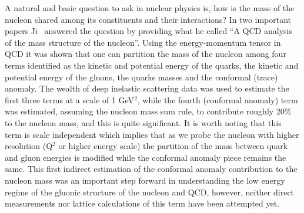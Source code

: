 \documentclass[12pt]{article}
\begin{document}
A natural and basic question to ask in nuclear physics is, how is the mass of the nucleon shared among its constituents and their interactions? In two important  papers Ji~\cite{Ji:1994av,Ji:1995sv} answered the question by providing what he called ``A QCD analysis of the mass structure of the nucleon''. Using the energy-momentum tensor in QCD it was shown that one can partition the mass of the nucleon among four terms identified as the kinetic and potential energy of the quarks, the  kinetic and potential energy of the gluons, the quarks masses and the conformal (trace) anomaly. The wealth of deep inelastic scattering data  was used to estimate the first three terms at a scale of 1 GeV$^2$, while the fourth (conformal anomaly)  term was estimated, assuming the nucleon mass sum rule, to contribute roughly 20\% to the nucleon mass, and this is quite significant. It is worth noting that this term is scale independent which implies that  as we probe the nucleon with higher resolution (Q$^2$ or higher energy scale) the partition of the mass between quark and gluon energies is modified while the conformal anomaly piece remains the same. This first indirect estimation of the conformal anomaly contribution  to the nucleon mass  was an important step forward in understanding the low energy regime of the gluonic structure of the nucleon and QCD, however, neither direct measurements nor lattice calculations of this term have been attempted yet. 


\end{document}
